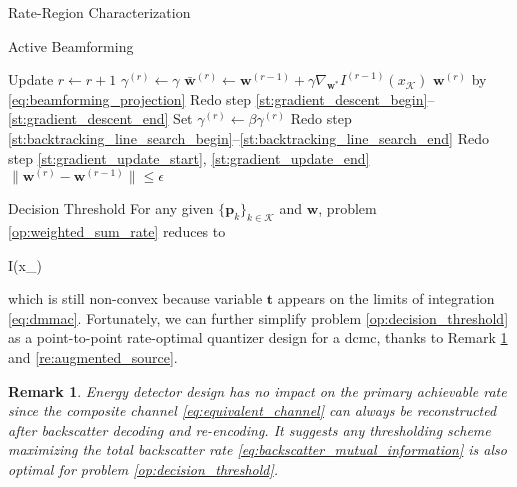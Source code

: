 \documentclass[journal]{IEEEtran}
\newtheorem{remark}{Remark}
\begin{document}
\begin{section}{Rate-Region Characterization}
\begin{subsection}{Active Beamforming}
\begin{algorithm}[!t]
\begin{algorithmic}[1]
				\Repeat
					\State Update $r \gets r+1$
					\State \phantom{Update} $\gamma^{(r)}\gets\gamma$
					\State \phantom{Update} $\bar{\boldsymbol{w}}^{(r)} \gets \boldsymbol{w}^{(r-1)}+\gamma\nabla_{\boldsymbol{w}^*} I^{(r-1)}(x_{\mathcal{K}})$ \label{st:backtracking_line_search_begin}
					\State \phantom{Update} $\boldsymbol{w}^{(r)}$ by \eqref{eq:beamforming_projection}
					\State Redo step \ref{st:gradient_descent_begin}--\ref{st:gradient_descent_end} \label{st:backtracking_line_search_end}
						\State Set $\gamma^{(r)}\gets\beta\gamma^{(r)}$
						\State Redo step \ref{st:backtracking_line_search_begin}--\ref{st:backtracking_line_search_end}
					\EndWhile
					\State Redo step \ref{st:gradient_update_start}, \ref{st:gradient_update_end}
				\Until $\lVert\boldsymbol{w}^{(r)}-\boldsymbol{w}^{(r-1)}\rVert \le \epsilon$
			\end{algorithmic}
		\end{algorithm}
	\end{subsection}

	\begin{subsection}{Decision Threshold}
		For any given $\{\boldsymbol{p}_k\}_{k \in \mathcal{K}}$ and $\boldsymbol{w}$, problem \eqref{op:weighted_sum_rate} reduces to
		\begin{maxi!}
			{}{I(x_{})}{\label{op:decision_threshold}}{\label{ob:decision_threshold}}
			\addConstraint{\eqref{co:sequential_threshold},\eqref{co:nonnegative_threshold},}
		\end{maxi!}
		which is still non-convex because variable $\boldsymbol{t}$ appears on the limits of integration \eqref{eq:dmmac}.
		Fortunately, we can further simplify problem \eqref{op:decision_threshold} as a point-to-point rate-optimal quantizer design for a \gls{dcmc}, thanks to Remark \ref{re:backscatter_decision} and \ref{re:augmented_source}.

		\begin{remark}
			Energy detector design has no impact on the primary achievable rate since the composite channel \eqref{eq:equivalent_channel} can always be reconstructed after backscatter decoding and re-encoding.
			It suggests any thresholding scheme maximizing the total backscatter rate \eqref{eq:backscatter_mutual_information} is also optimal for problem \eqref{op:decision_threshold}.
			\label{re:backscatter_decision}
		\end{remark}


\end{subsection}
\end{section}
\end{document}
